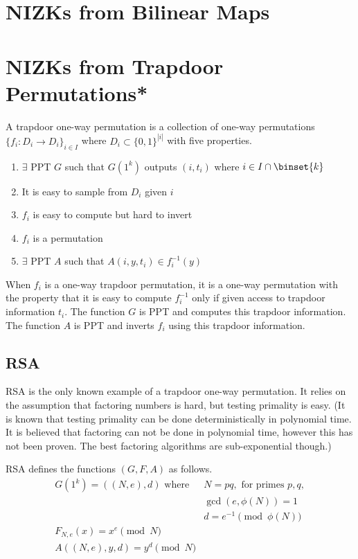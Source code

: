 \section{NIZKs from Bilinear Maps}


\section{NIZKs from Trapdoor Permutations*}

\begin{definition}
A trapdoor one-way permutation is a collection of one-way permutations $\{f_i : D_i \rightarrow D_i\}_{i \in I}$ where $D_i \subset \{0,1\}^{|i|}$ with
five properties.

\begin{enumerate}
\item $\exists$ PPT $G$ such that $G(1^k)$ outputs $(i,t_i)$ where $i \in I\cap \binset{k}$
\item It is easy to sample from $D_i$ given $i$ 
\item $f_i$ is easy to compute but hard to invert
\item  $f_i$ is a permutation
\item $\exists$ PPT $A$ such that $A(i, y, t_i)\in f_i^{-1}(y)$
\end{enumerate}
\end{definition}

When $f_i$ is a one-way trapdoor permutation, it is a one-way permutation with
the property that it is easy to compute $f_i^{-1}$ only if given access to trapdoor
information $t_i$. The function $G$ is PPT and computes this trapdoor information.
The function $A$ is PPT and inverts $f_i$ using this trapdoor information.

\subsection{RSA}

RSA is the only known example of a trapdoor one-way permutation.
It relies on the assumption that factoring numbers is hard,
but testing primality is easy. (It is known that testing primality can be done
deterministically in polynomial time. It is believed that factoring can not be done in
polynomial time, however this has not been proven. The best factoring algorithms
are sub-exponential though.)

\begin{definition}
RSA defines the functions $(G, F, A)$ as follows.
\begin{align*}
G(1^k) = ((N, e), d) \,\,\text{where} \,\,& N=pq, \,\, \text{for primes $p,q$},  \\
& \gcd(e,\phi(N))=1 \\
& d = e^{-1} \pmod{\phi(N)} \\
F_{N,e}(x) = x^e \pmod{N} & \\
A((N,e),y, d) = y^d \pmod{N} &
\end{align*}
\end{definition}

